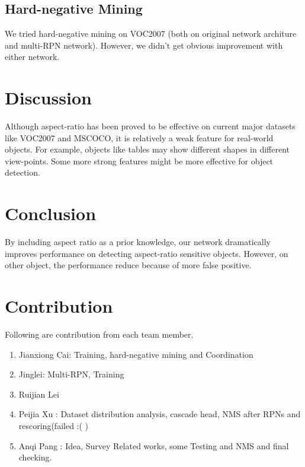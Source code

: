 \documentclass[10pt,twocolumn,letterpaper]{article}
\begin{document}
\subsection{Hard-negative Mining}
We tried hard-negative mining on VOC2007 (both on original network architure and multi-RPN network). However, we didn't get obvious improvement with either network. 


\section{Discussion}
\par
Although aspect-ratio has been proved to be effective on current major datasets like VOC2007 and MSCOCO, it is relatively a weak feature for real-world objects. For example, objects like tables may show different shapes in different view-points. Some more strong features might be more effective for object detection.  

\section{Conclusion}
By including aspect ratio as a prior knowledge, our network dramatically improves performance on detecting aspect-ratio sensitive objects. However, on other object, the performance reduce because of more false positive.

\section{Contribution}
Following are contribution from each team member.
\begin{enumerate}
\item Jianxiong Cai: Training, hard-negative mining and Coordination
\item Jinglei: Multi-RPN, Training
\item Ruijian Lei
\item Peijia Xu : Dataset distribution analysis, cascade head, NMS after RPNs and rescoring(failed :( )
\item Anqi Pang : Idea, Survey Related works, some Testing and NMS and final checking.
\end{enumerate}

{\small


}
\end{document}
